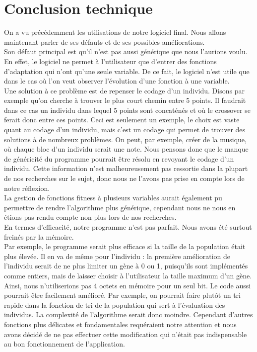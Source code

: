 \documentclass[a4paper,11pt]{article}
\begin{document}
		
	\section{Conclusion technique}
		On a vu précédemment les utilisations de notre logiciel final. Nous allons maintenant parler de ses défauts et de ses possibles améliorations.\\
		Son défaut principal est qu’il n’est pas aussi générique que nous l’aurions voulu. En effet, le logiciel ne permet à l’utilisateur que d’entrer des fonctions d’adaptation qui n’ont qu’une seule variable. De ce fait, le logiciel n’est utile que dans le cas où l’on veut observer l’évolution d’une fonction à une variable.\\
		Une solution à ce problème est de repenser le codage d’un individu. Disons par exemple qu’on cherche à trouver le plus court chemin entre 5 points. Il faudrait dans ce cas un individu dans lequel 5 points sont concaténés et où le crossover se ferait donc entre ces points. Ceci est seulement un exemple, le choix est vaste quant au codage d’un individu, mais c’est un codage qui permet de trouver des solutions à de nombreux problèmes. On peut, par exemple, créer de la musique, où chaque bloc d’un individu serait une note.  Nous pensons donc que le manque de généricité du programme pourrait être résolu en revoyant le codage d’un individu. Cette information n’est malheureusement pas ressortie dans la plupart de nos recherches sur le sujet, donc nous ne l’avons pas prise en compte lors de notre réflexion.\\
		La gestion de fonctions fitness à plusieurs variables aurait également pu permettre de rendre l'algorithme plus générique, cependant nous ne nous en étions pas rendu compte non plus lors de nos recherches.\\
		En termes d’efficacité, notre programme n’est pas parfait. Nous avons été surtout freinés par la mémoire.\\
		Par exemple, le programme serait plus efficace si la taille de la population était plus élevée. Il en va de même pour l’individu : la première amélioration de l’individu serait de ne plus limiter un gène à 0 ou 1, puisqu’ils sont implémentés comme entiers, mais de laisser choisir à l’utilisateur la taille maximum d’un gène. Ainsi, nous n’utiliserions pas 4 octets en mémoire pour un seul bit.
		Le code aussi pourrait être facilement amélioré. Par exemple, on pourrait faire plutôt un tri rapide dans la fonction de tri de la population qui sert à l’évaluation des individus. La complexité de l’algorithme serait donc moindre. Cependant d’autres fonctions plus délicates et fondamentales requéraient notre attention et nous avons décidé de ne pas effectuer cette modification qui n'était pas indispensable au bon fonctionnement de l’application.\\
\end{document}
